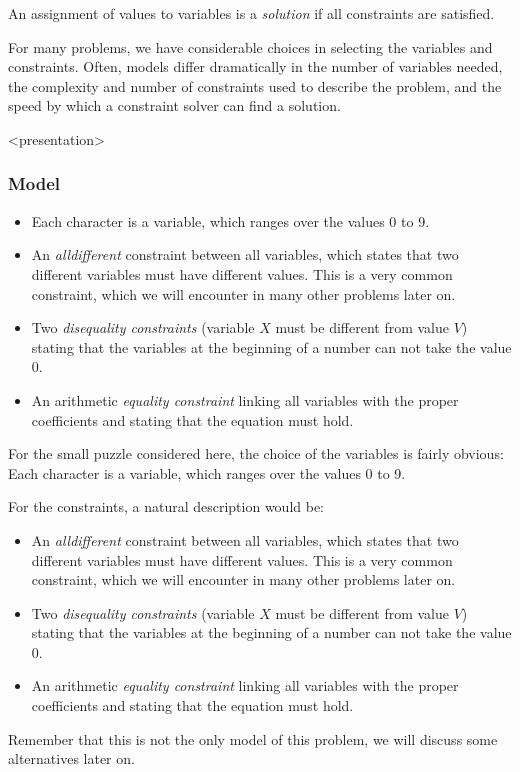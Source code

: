 An assignment of values to variables is a {\em solution} if all constraints are satisfied.

For many problems, we have considerable choices in selecting the variables and constraints. Often, models differ dramatically in the number of variables needed, the complexity and number of constraints used to describe the problem, and the speed by which a constraint solver can find a solution.

\begin{frame}<presentation>
\frametitle{Model}
\begin{itemize}
\item Each character is a variable, which ranges over the values 0 to 9.
\item An {\em alldifferent} constraint between all variables, which states that two different variables must have different values. This is a very common constraint, which we will encounter in many other problems later on.
\item Two {\em disequality constraints} (variable $X$ must be different from value $V$) stating that the variables at the beginning of a number can not take the value 0.
\item An arithmetic {\em equality constraint} linking all variables with the proper coefficients and stating that the equation must hold.
\end{itemize}
\end{frame}

For the small puzzle considered here, the choice of the variables is fairly obvious: Each character is a variable, which ranges over the values 0 to 9.

For the constraints, a natural description would be:
\begin{itemize}
\item An {\em alldifferent} constraint between all variables, which states that two different variables must have different values. This is a very common constraint, which we will encounter in many other problems later on.
\item Two {\em disequality constraints} (variable $X$ must be different from value $V$) stating that the variables at the beginning of a number can not take the value 0.
\item An arithmetic {\em equality constraint} linking all variables with the proper coefficients and stating that the equation must hold.
\end{itemize}
Remember that this is not the only model of this problem, we will discuss some alternatives later on.

